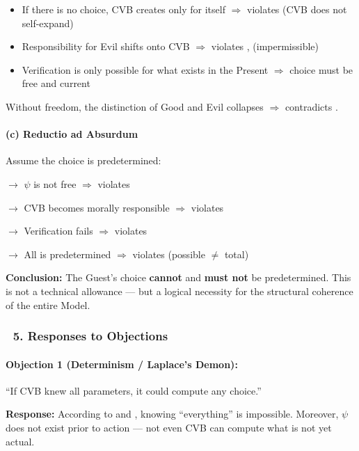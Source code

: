 \documentclass[12pt]{article}
\begin{document}
\begin{itemize}
\item If there is no choice, CVB creates only for itself $\Rightarrow$ violates \text{[13]} (CVB does not self-expand)
\item Responsibility for Evil shifts onto CVB $\Rightarrow$ violates \text{[11.3.2]}, \text{[28]} (impermissible)
\item Verification is only possible for what exists in the Present $\Rightarrow$ choice must be free and current
\end{itemize}

Without freedom, the distinction of Good and Evil collapses $\Rightarrow$ contradicts \text{[11.3.3]}.

\paragraph{(c) Reductio ad Absurdum}

Assume the choice is predetermined:

$\to$ $\psi$ is not free $\Rightarrow$ violates \text{[15.3]}

$\to$ CVB becomes morally responsible $\Rightarrow$ violates \text{[11.3.2]}

$\to$ Verification fails $\Rightarrow$ violates \text{[22]}

$\to$ All is predetermined $\Rightarrow$ violates \text{[3]} (possible $\neq$ total)

\textbf{Conclusion:} The Guest’s choice \textbf{cannot} and \textbf{must not} be predetermined. This is not a technical allowance — but a logical necessity for the structural coherence of the entire Model.

\subsubsection*{🔹 5. Responses to Objections}

\paragraph{Objection 1 (Determinism / Laplace’s Demon):}
``If CVB knew all parameters, it could compute any choice.''

\textbf{Response:}
According to \text{[2]} and \text{[4]}, knowing ``everything'' is impossible. Moreover, $\psi$ does not exist prior to action — not even CVB can compute what is not yet actual.

\bigskip
\end{document}
